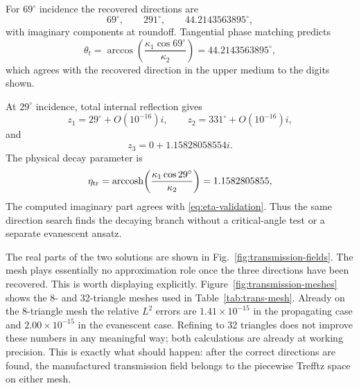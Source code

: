 \documentclass[pdflatex,sn-mathphys-num]{sn-jnl}
\theoremstyle{thmstyleone}
\theoremstyle{thmstyletwo}
\begin{document}
For $69^\circ$ incidence the recovered directions are
\begin{equation}\label{eq:69angles}
 69^\circ,\qquad291^\circ,\qquad44.2143563895^\circ,
\end{equation}
with imaginary components at roundoff.  Tangential phase matching predicts
\begin{equation}\label{eq:Snell-validation}
 \theta_t=\arccos\!\left(\frac{\kappa_1\cos69^\circ}{\kappa_2}\right)
 =44.2143563895^\circ,
\end{equation}
which agrees with the recovered direction in the upper medium to the digits shown.

At $29^\circ$ incidence, total internal reflection gives
\begin{equation}\label{eq:29angles}
 z_1=29^\circ+O(10^{-16})i,\qquad z_2=331^\circ+O(10^{-16})i,
\end{equation}
and
\begin{equation}\label{eq:evangle}
 z_3=0+1.15828058554i.
\end{equation}
The physical decay parameter is
\begin{equation}\label{eq:eta-validation}
 \eta_{\rm tr}=\operatorname{arccosh}\!\left(\frac{\kappa_1\cos29^\circ}{\kappa_2}\right)
 =1.1582805855,
\end{equation}
The computed imaginary part agrees with \eqref{eq:eta-validation}.  Thus the same direction search finds the decaying branch without a critical-angle test or a separate evanescent ansatz.

The real parts of the two solutions are shown in Fig.~\ref{fig:transmission-fields}.  The mesh plays essentially no approximation role once the three directions have been recovered.  This is worth displaying explicitly.  Figure~\ref{fig:transmission-meshes} shows the 8- and 32-triangle meshes used in Table~\ref{tab:trans-mesh}.  Already on the 8-triangle mesh the relative $L^2$ errors are $1.41\times10^{-15}$ in the propagating case and $2.00\times10^{-15}$ in the evanescent case.  Refining to 32 triangles does not improve these numbers in any meaningful way; both calculations are already at working precision.  This is exactly what should happen: after the correct directions are found, the manufactured transmission field belongs to the piecewise Trefftz space on either mesh.
\end{document}
